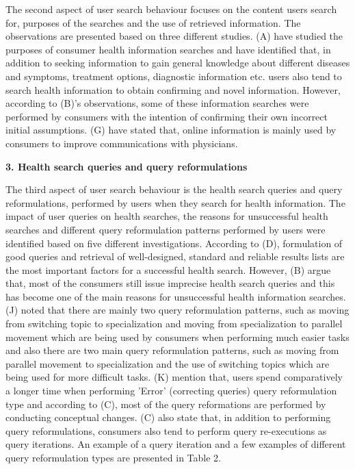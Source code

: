 \documentclass[]{article}
\begin{document}
The second aspect of user search behaviour focuses on the content users search for, purposes of the searches and the use of retrieved information. The observations are presented based on three different studies. (A) have studied the purposes of consumer health information searches and have identified that, in addition to seeking information to gain general knowledge about different diseases and symptoms, treatment options, diagnostic information etc. users also tend to search health information to obtain confirming and novel information. However, according to (B)'s observations, some of these information searches were performed by consumers with the intention of confirming their own incorrect initial assumptions. (G) have stated that, online information is mainly used by consumers to improve communications with physicians. 



\textbf{3. Health search queries and query reformulations}


The third aspect of user search behaviour is the health search queries and query reformulations, performed by users when they search for health information. The impact of user queries on health searches, the reasons for unsuccessful health searches and different query reformulation patterns performed by users were identified based on five different investigations. According to (D), formulation of good queries and retrieval of well-designed, standard and reliable results lists are the most important factors for a successful health search. However, (B) argue that, most of the consumers still issue imprecise health search queries and this has become one of the main reasons for unsuccessful health information searches. (J) noted that there are mainly two query reformulation patterns, such as moving from switching topic to specialization and moving from specialization to parallel movement which are being used by consumers when performing much easier tasks and also there are two main query reformulation patterns, such as moving from parallel movement to specialization and the use of switching topics which are being used for more difficult tasks. (K) mention that, users spend comparatively a longer time when performing 'Error' (correcting queries) query reformulation type and according to (C), most of the query reformations are performed by conducting conceptual changes. (C) also state that, in addition to performing query reformulations, consumers also tend to perform query re-executions as query iterations. An example of a query iteration and a few examples of different query reformulation types are presented in Table 2.  
\end{document}

